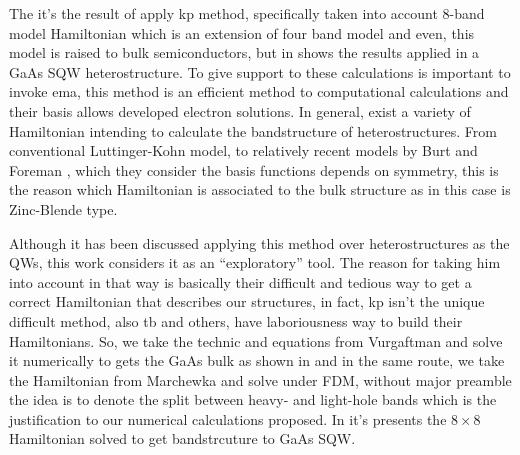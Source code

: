 The  it's the result of apply \gls{kp} method, specifically taken into account 8-band model Hamiltonian\cite{kane1957bandstructure,galeriu2005k,vurgaftman2020bands} which is an extension of four band model\cite{galeriu2005k} and even, this model is raised to bulk semiconductors, but in  shows the results applied in a GaAs SQW heterostructure. To give support to these calculations is important to invoke \gls{ema}, this method is an efficient method to computational calculations\cite{yeo2020first,harrison2016quantum} and their basis allows developed electron solutions. In general,  exist a variety of Hamiltonian intending to calculate the bandstructure of heterostructures. From conventional Luttinger-Kohn model, \cite{Luttinger1955motion} to relatively recent models by Burt and Foreman \cite{burt1988aneweffective,foreman1993effective,burt1992justification}, which they consider the basis functions depends on symmetry, this is the reason which  Hamiltonian is associated to the bulk structure as in this case is Zinc-Blende type. 

Although it has been discussed applying this method over heterostructures as the QWs, this work considers it as an ``exploratory'' tool. The reason for taking him into account in that way is basically their difficult and tedious way to get a correct Hamiltonian that describes our structures, in fact, \gls{kp} isn't the unique difficult method, also \gls{tb} and others, have laboriousness way to build their Hamiltonians. So, we take the technic and equations from Vurgaftman \cite{vurgaftman2020bands} and solve it numerically to gets the GaAs bulk as shown in  and in the same route, we take the Hamiltonian from Marchewka\cite{marchewka2017finite,novik2005bandstructure} and solve under \gls{FDM}, without major preamble the idea is to denote the split between heavy- and light-hole bands which is the justification to our numerical calculations proposed. In  it's presents the $8\times 8$ Hamiltonian solved to get bandstrcuture to GaAs SQW.

